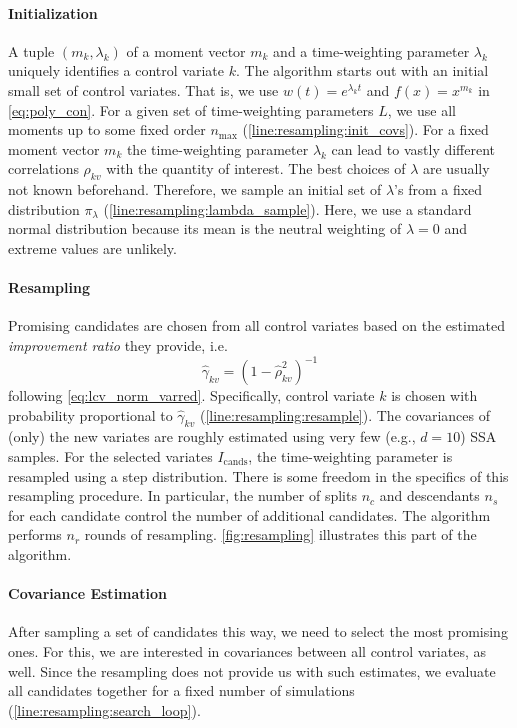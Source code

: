 \paragraph{Initialization} A tuple $({m}_k, \lambda_k)$ of a moment
vector ${m}_k$ and a time-weighting parameter $\lambda_k$
uniquely identifies a control variate $k$.
The algorithm starts out with an initial small set of control variates.
That is, we use $w(t)=e^{\lambda_kt}$ and $f(x)=x^{m_k}$ in \eqref{eq:poly_con}.
For a given set of time-weighting parameters $L$, we use all moments
up to some fixed order $n_{\max}$ (\autoref{line:resampling:init_covs}).
For a fixed moment vector $m_k$ the time-weighting parameter
$\lambda_k$ can lead to vastly different correlations $\rho_{kv}$
with the quantity of interest.
The best choices of $\lambda$ are usually not known beforehand.
Therefore, we sample an initial set of $\lambda$'s
from a fixed distribution $\pi_{\lambda}$
(\autoref{line:resampling:lambda_sample}).
Here, we use a standard normal distribution because its mean is the
neutral weighting of $\lambda=0$ and extreme values are unlikely.

\paragraph{Resampling} Promising candidates are chosen from all
control variates based on the estimated \emph{improvement ratio} they
provide, i.e.\
\begin{equation}
  \hat{\gamma}_{kv} = ({1 - \hat{\rho}_{kv}^2})^{-1}
\end{equation}
following \eqref{eq:lcv_norm_varred}.
Specifically, control variate $k$ is chosen with probability proportional to
${\hat{\gamma}}_{kv}$ (\autoref{line:resampling:resample}).
The covariances of (only) the new variates are roughly estimated
using very few (e.g., $d= 10$) \ac{SSA} samples.
For the selected variates $I_{\text{cands}}$, the time-weighting
parameter is resampled using a step distribution.
There is some freedom in the specifics of this resampling procedure.
In particular, the number of splits $n_c$ and descendants $n_s$ for
each candidate control the number of additional candidates.
The algorithm performs $n_r$ rounds of resampling.
\autoref{fig:resampling} illustrates this part of the algorithm.

\paragraph{Covariance Estimation} After sampling a set of candidates
this way, we need to select the most promising ones.
For this, we are interested in covariances between all control
variates, as well.
Since the resampling does not provide us with such estimates, we
evaluate all candidates together for a fixed number of simulations
(\autoref{line:resampling:search_loop}).

